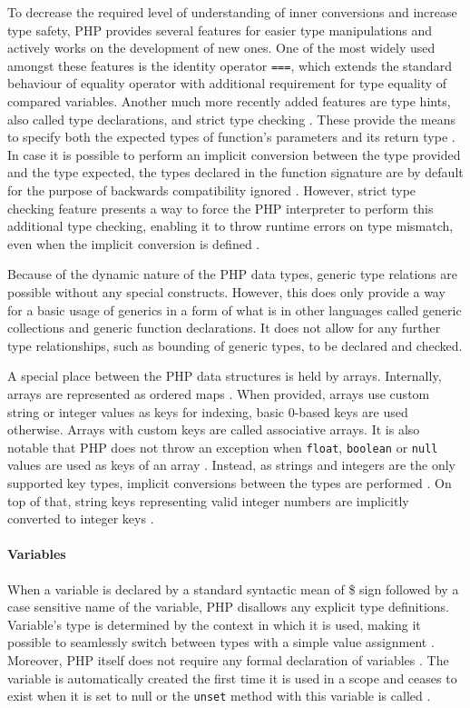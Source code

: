 To decrease the required level of understanding of inner conversions and increase type safety, PHP provides several features for easier type manipulations and actively works on the development of new ones. One of the most widely used amongst these features is the identity operator \texttt{===}, which extends the standard behaviour of equality operator with additional requirement for type equality of compared variables. Another much more recently added features are type hints, also called type declarations, and strict type checking \citep{php.manual}. These provide the means to specify both the expected types of function's parameters and its return type \citep{php.manual}. In case it is possible to perform an implicit conversion between the type provided and the type expected, the types declared in the function signature are by default for the purpose of backwards compatibility ignored \citep{php.manual}. However, strict type checking feature presents a way to force the PHP interpreter to perform this additional type checking, enabling it to throw runtime errors on type mismatch, even when the implicit conversion is defined \citep{php.manual}.

Because of the dynamic nature of the PHP data types, generic type relations are possible without any special constructs. However, this does only provide a way for a basic usage of generics in a form of what is in other languages called generic collections and generic function declarations. It does not allow for any further type relationships, such as bounding of generic types, to be declared and checked.

A special place between the PHP data structures is held by arrays. Internally, arrays are represented as ordered maps \citep{php.manual}. When provided, arrays use custom string or integer values as keys for indexing, basic 0-based keys are used otherwise. Arrays with custom keys are called associative arrays. It is also notable that PHP does not throw an exception when \texttt{float}, \texttt{boolean} or \texttt{null} values are used as keys of an array \citep{php.manual}. Instead, as strings and integers are the only supported key types, implicit conversions between the types are performed \citep{php.manual}. On top of that, string keys representing valid integer numbers are implicitly converted to integer keys \citep{php.manual}. 

\paragraph{Variables}
When a variable is declared by a standard syntactic mean of \$ sign followed by a case sensitive name of the variable, PHP disallows any explicit type definitions. Variable's type is determined by the context in which it is used, making it possible to seamlessly switch between types with a simple value assignment \citep{php.manual}. Moreover, PHP itself does not require any formal declaration of variables \citep{php.manual}. The variable is automatically created the first time it is used in a scope and ceases to exist when it is set to null or the \texttt{unset} method with this variable is called \citep{php.manual}. 

